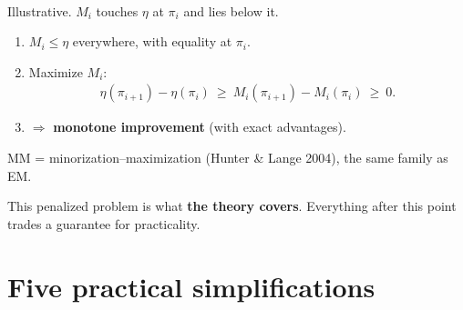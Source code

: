 \begin{minipage}[c]{0.48\linewidth}
\centering
{}\\
{\scriptsize Illustrative. $M_i$ touches $\eta$ at $\pi_i$ and lies below it.}
\end{minipage}\hfill
\begin{minipage}[c]{0.48\linewidth}
\begin{enumerate}
  \item $M_i\le\eta$ everywhere, with equality at $\pi_i$.
  \item Maximize $M_i$:
  \begin{gather*}
    \eta(\pi_{i+1})-\eta(\pi_i)\ \ge\ M_i(\pi_{i+1})-M_i(\pi_i)\ \ge\ 0.
  \end{gather*}
  \item $\Rightarrow$ \textbf{monotone improvement} (with exact advantages).
\end{enumerate}
{\small MM = minorization--maximization (Hunter \& Lange 2004), the same family as EM.}
\end{minipage}

\begin{keybox}
This penalized problem is what \textbf{the theory covers}. Everything after this point trades a guarantee for practicality.
\end{keybox}

\section{Five practical simplifications}

